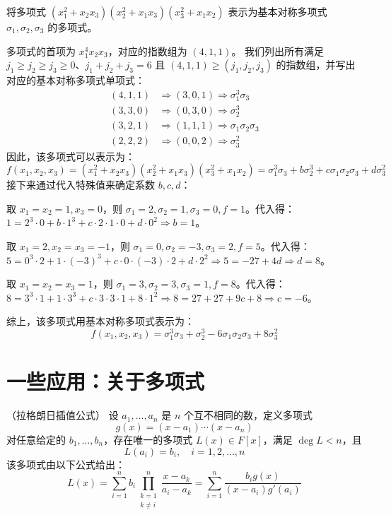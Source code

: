 \begin{example}
	将多项式 \( (x_1^2 + x_2x_3)(x_2^2 + x_1x_3)(x_3^2 + x_1x_2) \) 表示为基本对称多项式 \( \sigma_1, \sigma_2, \sigma_3 \) 的多项式。
	
	
\end{example}
\begin{solution}
多项式的首项为 \( x_1^4x_2x_3 \)，对应的指数组为 \( (4,1,1) \)。
我们列出所有满足 \( j_1 \ge j_2 \ge j_3 \ge 0 \)、\( j_1+j_2+j_3=6 \) 且 \( (4,1,1) \ge (j_1,j_2,j_3) \) 的指数组，并写出对应的基本对称多项式单项式：
\[
\begin{aligned}
	(4,1,1) &\Rightarrow (3,0,1) \Rightarrow \sigma_1^3\sigma_3 \\
	(3,3,0) &\Rightarrow (0,3,0) \Rightarrow \sigma_2^3 \\
	(3,2,1) &\Rightarrow (1,1,1) \Rightarrow \sigma_1\sigma_2\sigma_3 \\
	(2,2,2) &\Rightarrow (0,0,2) \Rightarrow \sigma_3^2
\end{aligned}
\]
因此，该多项式可以表示为：
\[
f(x_1,x_2,x_3) = (x_1^2 + x_2x_3)(x_2^2 + x_1x_3)(x_3^2 + x_1x_2) = \sigma_1^3\sigma_3 + b\sigma_2^3 + c\sigma_1\sigma_2\sigma_3 + d\sigma_3^2
\]
接下来通过代入特殊值来确定系数 \(b, c, d\)：

取 \(x_1=x_2=1, x_3=0\)，则 \( \sigma_1=2, \sigma_2=1, \sigma_3=0, f=1 \)。代入得：
\(1 = 2^3 \cdot 0 + b \cdot 1^3 + c \cdot 2 \cdot 1 \cdot 0 + d \cdot 0^2 \Rightarrow b=1\)。

取 \(x_1=2, x_2=x_3=-1\)，则 \( \sigma_1=0, \sigma_2=-3, \sigma_3=2, f=5 \)。代入得：
\(5 = 0^3 \cdot 2 + 1 \cdot (-3)^3 + c \cdot 0 \cdot (-3) \cdot 2 + d \cdot 2^2 \Rightarrow 5 = -27 + 4d \Rightarrow d=8\)。

 取 \(x_1=x_2=x_3=1\)，则 \( \sigma_1=3, \sigma_2=3, \sigma_3=1, f=8 \)。代入得：
\(8 = 3^3 \cdot 1 + 1 \cdot 3^3 + c \cdot 3 \cdot 3 \cdot 1 + 8 \cdot 1^2 \Rightarrow 8 = 27 + 27 + 9c + 8 \Rightarrow c=-6\)。

综上，该多项式用基本对称多项式表示为：
\[
f(x_1,x_2,x_3) = \sigma_1^3\sigma_3 + \sigma_2^3 - 6\sigma_1\sigma_2\sigma_3 + 8\sigma_3^2
\]



\end{solution}
\section{一些应用：关于多项式}
\begin{proposition}（拉格朗日插值公式）
	设 \( a_1,\dots,a_n \) 是 \( n \) 个互不相同的数，定义多项式
	\[
	g(x) = (x-a_1)\cdots(x-a_n)
	\]
	对任意给定的 \( b_1,\dots,b_n \)，存在唯一的多项式 \( L(x) \in F[x] \)，满足 \( \deg L < n \)，且
	\[
	L(a_i) = b_i,\quad i=1,2,\dots,n
	\]
	该多项式由以下公式给出：
	\[
	L(x) = \sum_{i=1}^n b_i \prod_{\substack{k=1 \\ k\neq i}}^n \frac{x-a_k}{a_i-a_k} = \sum_{i=1}^n \frac{b_i g(x)}{(x-a_i)g'(a_i)}
	\]
	
\end{proposition}


